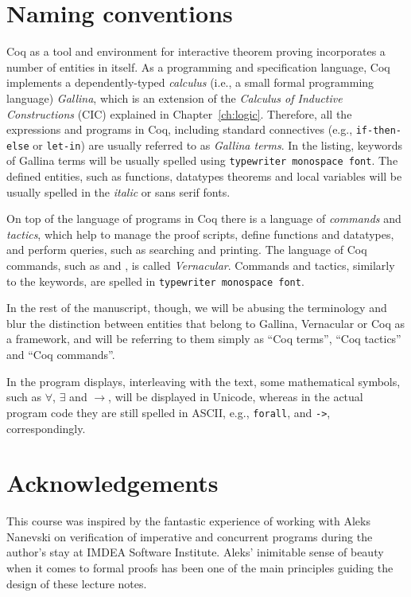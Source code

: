 \section{Naming conventions}




Coq as a tool and environment for interactive theorem proving
incorporates a number of entities in itself. As a programming and
specification language, Coq implements a dependently-typed \textit{calculus}
(i.e., a small formal programming language) \textit{Gallina},
 which is an extension of the \textit{Calculus of Inductive
Constructions} (CIC) explained in Chapter~\ref{ch:logic}. Therefore,
all the expressions and programs in Coq, including standard
connectives (e.g., \texttt{if-then-else} or \texttt{let-in}) are
usually referred to as \textit{Gallina terms}. In the listing, keywords of
Gallina terms will be usually spelled using \texttt{typewriter
monospace font}. The defined entities, such as functions, datatypes
theorems and local variables will be usually spelled in the
\emph{italic} or \textsf{sans serif} fonts.


On top of the language of programs in Coq there is a language of
\textit{commands} and \textit{tactics}, which help to manage the proof scripts,
define functions and datatypes, and perform queries, such as searching
and printing. The language of Coq commands, such as  and
, is called \textit{Vernacular}.  Commands and
tactics, similarly to the keywords, are spelled in \texttt{typewriter
monospace font}.


In the rest of the manuscript, though, we will be abusing the
terminology and blur the distinction between entities that belong to
Gallina, Vernacular or Coq as a framework, and will be referring to
them simply as ``Coq terms'', ``Coq tactics'' and ``Coq commands''.


In the program displays, interleaving with the text, some mathematical
symbols, such as $\forall$, $\exists$ and $\rightarrow$, will be
displayed in Unicode, whereas in the actual program code they are
still spelled in ASCII, e.g., \texttt{forall},  and
\texttt{->}, correspondingly.


\section{Acknowledgements}




This course was inspired by the fantastic experience of working with
Aleks Nanevski on verification of imperative and concurrent programs
during the author's stay at IMDEA Software Institute.  Aleks'
inimitable sense of beauty when it comes to formal proofs has been one
of the main principles guiding the design of these lecture notes.


